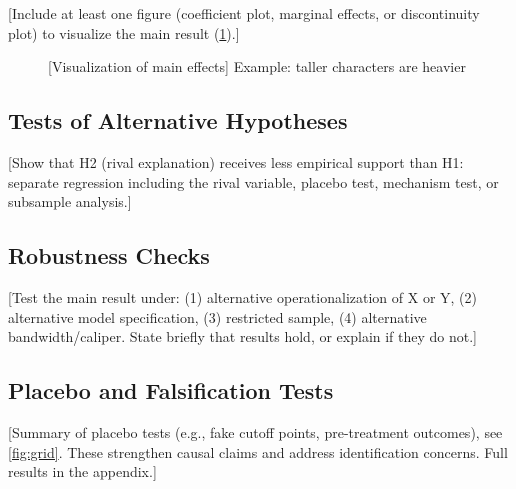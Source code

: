 [Include at least one figure (coefficient plot, marginal effects, or discontinuity plot) to visualize the main result (\cref{fig:main}).]

\begin{figure}[htbp]                 %
    \centering
    \caption{[Visualization of main effects] Example: taller characters are heavier} %
    \label{fig:main}                                     %
\end{figure}

\subsection{Tests of Alternative Hypotheses} %
[Show that H2 (rival explanation) receives less empirical support than H1: separate regression including the rival variable, placebo test, mechanism test, or subsample analysis.]

\subsection{Robustness Checks} %
[Test the main result under: (1) alternative operationalization of X or Y, (2) alternative model specification, (3) restricted sample, (4) alternative bandwidth/caliper. State briefly that results hold, or explain if they do not.]

\subsection{Placebo and Falsification Tests} %
[Summary of placebo tests (e.g., fake cutoff points, pre-treatment outcomes), see \cref{fig:grid}. These strengthen causal claims and address identification concerns. Full results in the appendix.]

